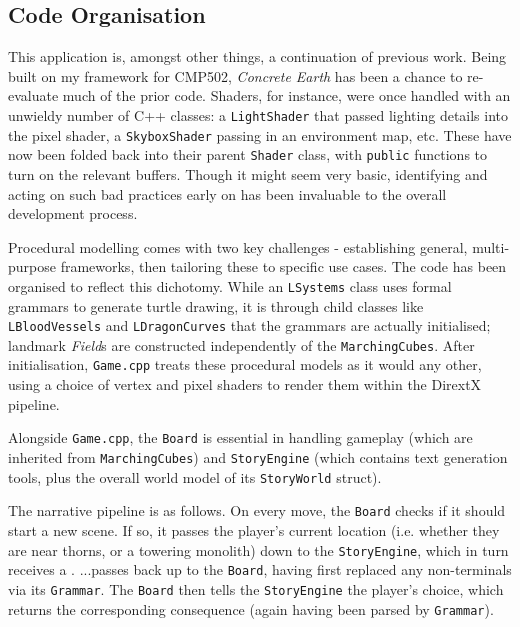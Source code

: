 \documentclass[a4paper, 11pt]{article}
\begin{document}
\begin{flushleft}
\section{Code Organisation}

This application is, amongst other things, a continuation of previous work. Being built on my framework for CMP502, \textit{Concrete Earth} has been a chance to re-evaluate much of the prior code. Shaders, for instance, were once handled with an unwieldy number of C++ classes: a \texttt{LightShader} that passed lighting details into the pixel shader, a \texttt{SkyboxShader} passing in an environment map, etc. These have now been folded back into their parent \texttt{Shader} class, with \texttt{public} functions to turn on the relevant buffers. Though it might seem very basic, identifying and acting on such bad practices early on has been invaluable to the overall development process.

\vspace{5pt}\noindent
Procedural modelling comes with two key challenges - establishing general, multi-purpose frameworks, then tailoring these to specific use cases. The code has been organised to reflect this dichotomy. While an \texttt{LSystems} class uses formal grammars to generate turtle drawing, it is through child classes like \texttt{LBloodVessels} and \texttt{LDragonCurves} that the grammars are actually initialised; landmark \textit{Field}s are constructed independently of the \texttt{MarchingCubes}. After initialisation, \texttt{Game.cpp} treats these procedural models as it would any other, using a choice of vertex and pixel shaders to render them within the DirextX pipeline.

\vspace{5pt}\noindent
Alongside \texttt{Game.cpp}, the \texttt{Board} is essential in handling gameplay (which are inherited from \texttt{MarchingCubes}) and \texttt{StoryEngine} (which contains text generation tools, plus the overall world model of its \texttt{StoryWorld} struct).

\vspace{5pt}\noindent
The narrative pipeline is as follows. On every move, the \texttt{Board} checks if it should start a new scene. If so, it passes the player's current location (i.e. whether they are near thorns, or a towering monolith) down to the \texttt{StoryEngine}, which in turn receives a . ...passes back up to the \texttt{Board}, having first replaced any non-terminals via its \texttt{Grammar}. The \texttt{Board} then tells the \texttt{StoryEngine} the player's choice, which returns the corresponding consequence (again having been parsed by \texttt{Grammar}).


\end{flushleft}
\end{document}
